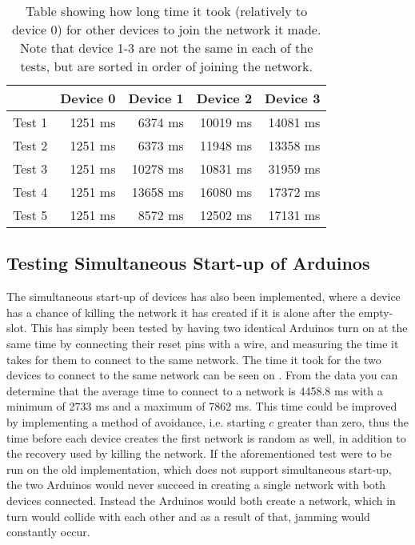 \begin{table}[H]
\footnotesize
\centering  
{}
\begin{tabular}{r | r r r r}
        & Device 0  & Device 1  & Device 2  & Device 3  \\\midrule
 Test 1 &   1251 ms &   6374 ms &   10019 ms&   14081 ms\\
 Test 2 &   1251 ms &   6373 ms &   11948 ms&   13358 ms\\
 Test 3 &   1251 ms &   10278 ms&   10831 ms&   31959 ms\\
 Test 4 &   1251 ms &   13658 ms&   16080 ms&   17372 ms\\
 Test 5 &   1251 ms &   8572 ms &   12502 ms&   17131 ms\\   
\end{tabular}
\caption{Table showing how long time it took (relatively to device 0) for other devices to join the network it made. Note that device 1-3 are not the same in each of the tests, but are sorted in order of joining the network.}
\label{tab:ccrc_test}
\end{table}

\subsection{Testing Simultaneous Start-up of Arduinos}
The simultaneous start-up of devices has also been implemented, where a device has a chance of killing the network it has created if it is alone after the empty-slot.
This has simply been tested by having two identical Arduinos turn on at the same time by connecting their reset pins with a wire, and measuring the time it takes for them to connect to the same network.
The time it took for the two devices to connect to the same network can be seen on .
From the data you can determine that the average time to connect to a network is 4458.8 ms with a minimum of 2733 ms and a maximum of 7862 ms.
This time could be improved by implementing a method of avoidance, i.e. starting $c$ greater than zero, thus the time before each device creates the first network is random as well, in addition to the recovery used by killing the network.
If the aforementioned test were to be run on the old implementation, which does not support simultaneous start-up, the two Arduinos would never succeed in creating a single network with both devices connected.
Instead the Arduinos would both create a network, which in turn would collide with each other and as a result of that, jamming would constantly occur.

